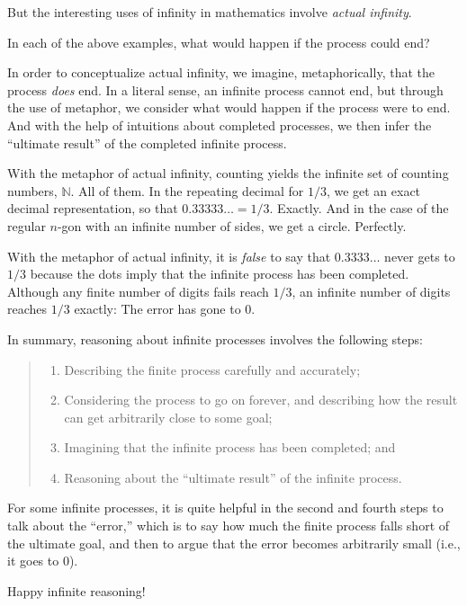 \documentclass[nooutcomes]{ximera}
\begin{document}
But the interesting uses of infinity in mathematics involve \emph{actual infinity}.  
\begin{question}
In each of the above examples, what would happen if the process could end?
\end{question}

In order to conceptualize actual infinity, we imagine, metaphorically, that the process \emph{does} end.  In a literal sense, an infinite process cannot end, but through the use of metaphor, we consider what would happen if the process were to end.  And with the help of intuitions about completed processes, we then infer the ``ultimate result'' of the completed infinite process.    

With the metaphor of actual infinity, counting yields the infinite set of counting numbers, $\mathbb{N}$.  All of them.  In the repeating decimal for $1/3$, we get an exact decimal representation, so that $0.33333\ldots = 1/3$.  Exactly.  And in the case of the regular $n$-gon with an infinite number of sides, we get a circle.  Perfectly.  

\begin{warning}
With the metaphor of actual infinity, it is \emph{false} to say that $0.3333\ldots$ never gets to $1/3$ because the dots imply that the infinite process has been completed.  Although any finite number of digits fails reach $1/3$, an infinite number of digits reaches $1/3$ exactly:  The error has gone to 0.  
\end{warning}

In summary, reasoning about infinite processes involves the following steps:  
\begin{quote}
\begin{enumerate}
\item Describing the finite process carefully and accurately;
\item Considering the process to go on forever, and describing how the result can get arbitrarily close to some goal;
\item Imagining that the infinite process has been completed; and
\item Reasoning about the ``ultimate result'' of the infinite process.
\end{enumerate}
\end{quote}

For some infinite processes, it is quite helpful in the second and fourth steps to talk about the ``error,'' which is to say how much the finite process falls short of the ultimate goal, and then to argue that the error becomes arbitrarily small (i.e., it goes to 0). 

\vspace{0.2in}

Happy infinite reasoning!   
\end{document}
